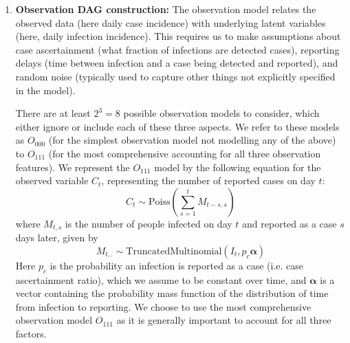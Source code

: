 \documentclass{article}
\begin{document}
\begin{enumerate}
\item \textbf{Observation DAG construction:} The observation model relates the observed data (here daily case incidence) with underlying latent variables (here, daily infection incidence). 
This requires us to make assumptions about case ascertainment (what fraction of infections are detected cases), reporting delays (time between infection and a case being detected and reported), and random noise (typically used to capture other things not explicitly specified in the model).

There are at least  $2^3=8$ possible observation models to consider, which either ignore or include each of these three aspects.
We refer to these models as $O_{000}$ (for the simplest observation model not modelling any of the above) to $O_{111}$ (for the most comprehensive accounting for all three observation features). We represent the $O_{111}$ model by the following equation for the observed variable $C_t$, representing the number of reported cases on day $t$:
\begin{equation} \label{eq:cases}
    C_t \sim \mathrm{Poiss}\left( \sum_{s=1}^t M_{t-s,s}\right)
\end{equation}
where $M_{t,s}$ is the number of people infected on day $t$ and reported as a case $s$ days later, given by
\begin{equation}
    M_{t,.} \sim \mathrm{TruncatedMultinomial}\left( I_t, p_c \boldsymbol{\alpha} \right) 
\end{equation}
Here $p_c$ is the probability an infection is reported as a case (i.e. case ascertainment ratio), which we assume to be constant over time, and $\boldsymbol{\alpha}$ is a vector containing the probability mass function of the distribution of time from infection to reporting. We choose to use the most comprehensive observation model $O_{111}$ as it is generally important to account for all three factors.




\end{enumerate}
\end{document}
